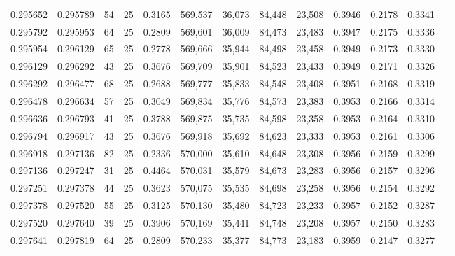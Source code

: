 \begin{tabular}{rrrrrrrrrrrrr}
0.295652 & 0.295789 &    54 &  25 &                                     0.3165 & 569,537 &  36,073 &  84,448 &  23,508 & 0.3946 & 0.2178 & 0.3341 \\
0.295792 & 0.295953 &    64 &  25 &                                     0.2809 & 569,601 &  36,009 &  84,473 &  23,483 & 0.3947 & 0.2175 & 0.3336 \\
0.295954 & 0.296129 &    65 &  25 &                                     0.2778 & 569,666 &  35,944 &  84,498 &  23,458 & 0.3949 & 0.2173 & 0.3330 \\
0.296129 & 0.296292 &    43 &  25 &                                     0.3676 & 569,709 &  35,901 &  84,523 &  23,433 & 0.3949 & 0.2171 & 0.3326 \\
0.296292 & 0.296477 &    68 &  25 &                                     0.2688 & 569,777 &  35,833 &  84,548 &  23,408 & 0.3951 & 0.2168 & 0.3319 \\
0.296478 & 0.296634 &    57 &  25 &                                     0.3049 & 569,834 &  35,776 &  84,573 &  23,383 & 0.3953 & 0.2166 & 0.3314 \\
0.296636 & 0.296793 &    41 &  25 &                                     0.3788 & 569,875 &  35,735 &  84,598 &  23,358 & 0.3953 & 0.2164 & 0.3310 \\
0.296794 & 0.296917 &    43 &  25 &                                     0.3676 & 569,918 &  35,692 &  84,623 &  23,333 & 0.3953 & 0.2161 & 0.3306 \\
0.296918 & 0.297136 &    82 &  25 &                                     0.2336 & 570,000 &  35,610 &  84,648 &  23,308 & 0.3956 & 0.2159 & 0.3299 \\
0.297136 & 0.297247 &    31 &  25 &                                     0.4464 & 570,031 &  35,579 &  84,673 &  23,283 & 0.3956 & 0.2157 & 0.3296 \\
0.297251 & 0.297378 &    44 &  25 &                                     0.3623 & 570,075 &  35,535 &  84,698 &  23,258 & 0.3956 & 0.2154 & 0.3292 \\
0.297378 & 0.297520 &    55 &  25 &                                     0.3125 & 570,130 &  35,480 &  84,723 &  23,233 & 0.3957 & 0.2152 & 0.3287 \\
0.297520 & 0.297640 &    39 &  25 &                                     0.3906 & 570,169 &  35,441 &  84,748 &  23,208 & 0.3957 & 0.2150 & 0.3283 \\
0.297641 & 0.297819 &    64 &  25 &                                     0.2809 & 570,233 &  35,377 &  84,773 &  23,183 & 0.3959 & 0.2147 & 0.3277 \\

\end{tabular}
